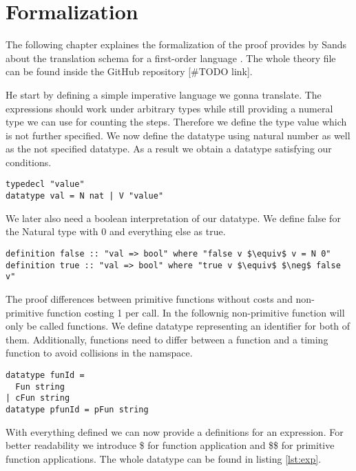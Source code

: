 
\chapter{Formalization}\label{chapter:formal}

The following chapter explaines the formalization of the proof provides by Sands about the translation schema for a first-order language \parencite{sands}.
The whole theory file can be found inside the GitHub repository [\#TODO link].

He start by defining a simple imperative language we gonna translate.
The expressions should work under arbitrary types while still providing a numeral type we can use for counting the steps.
Therefore we define the type value which is not further specified.
We now define the datatype using natural number as well as the not specified datatype.
As a result we obtain a datatype satisfying our conditions.
\begin{lstlisting}[language=isabelle]
typedecl "value"
datatype val = N nat | V "value"
\end{lstlisting}

We later also need a boolean interpretation of our datatype.
We define false for the Natural type with 0 and everything else as true.
\begin{lstlisting}[mathescape=true,language=isabelle]
definition false :: "val => bool" where "false v $\equiv$ v = N 0"
definition true :: "val => bool" where "true v $\equiv$ $\neg$ false v"
\end{lstlisting}

The proof differences between primitive functions without costs and non-primitive function costing 1 per call.
In the follownig non-primitive function will only be called functions.
We define datatype representing an identifier for both of them.
Additionally, functions need to differ between a function and a timing function to avoid collisions in the namspace.

\begin{lstlisting}[language=isabelle]
datatype funId =
  Fun string
| cFun string
datatype pfunId = pFun string
\end{lstlisting}

With everything defined we can now provide a definitions for an expression.
For better readability we introduce \$ for function application and \$\$ for primitive function applications. The whole datatype can be found in listing \ref{lst:exp}.

